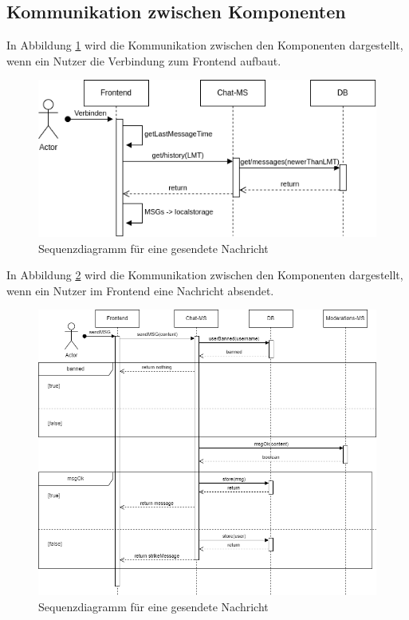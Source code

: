 \documentclass[12pt]{report}
\begin{document}
\subsection{Kommunikation zwischen Komponenten}
In Abbildung \ref{fig:seq_start} wird die Kommunikation zwischen den Komponenten dargestellt, wenn ein Nutzer die Verbindung zum Frontend aufbaut.
\begin{figure}[htbp]
	\centering
	\includegraphics[width=\linewidth]{sequence_start}
	\caption{Sequenzdiagramm für eine gesendete Nachricht}
	\label{fig:seq_start}
\end{figure}

In Abbildung \ref{fig:seq_msg} wird die Kommunikation zwischen den Komponenten dargestellt, wenn ein Nutzer im Frontend eine Nachricht absendet.
\begin{figure}[htbp]
	\centering
	\includegraphics[width=\linewidth]{sequence_msg}
	\caption{Sequenzdiagramm für eine gesendete Nachricht}
	\label{fig:seq_msg}
\end{figure}
\newpage
\end{document}
